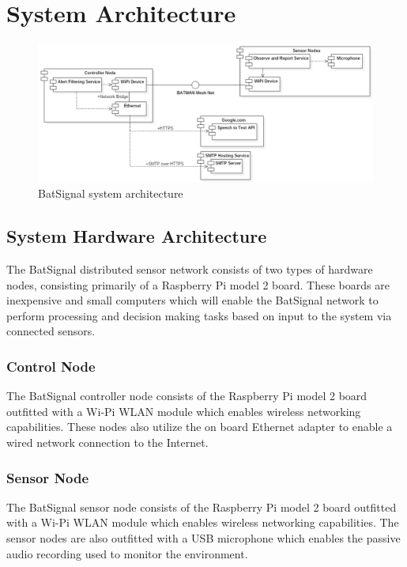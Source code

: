 \documentclass[11pt,a4paper]{article}
\begin{document}
\section{System Architecture}
\begin{figure}[H]
	\centering
		\includegraphics[width=\textwidth, keepaspectratio=true]{Graphics/SystemArchitecture.png}
	\caption{BatSignal system architecture}
\end{figure}

\subsection{System Hardware Architecture}
The BatSignal distributed sensor network consists of two types of hardware nodes, consisting primarily of a Raspberry Pi model 2 board. These boards are inexpensive and small computers which will enable the BatSignal network to perform processing and decision making tasks based on input to the system via connected sensors. 

\subsubsection{Control Node}
The BatSignal controller node consists of the Raspberry Pi model 2 board outfitted with a Wi-Pi WLAN module which enables wireless networking capabilities. These nodes also utilize the on board Ethernet adapter to enable a wired network connection to the Internet.

\subsubsection{Sensor Node}
The BatSignal sensor node consists of the Raspberry Pi model 2 board outfitted with a Wi-Pi WLAN module which enables wireless networking capabilities. The sensor nodes are also outfitted with a USB microphone which enables the passive audio recording used to monitor the environment.
\end{document}
